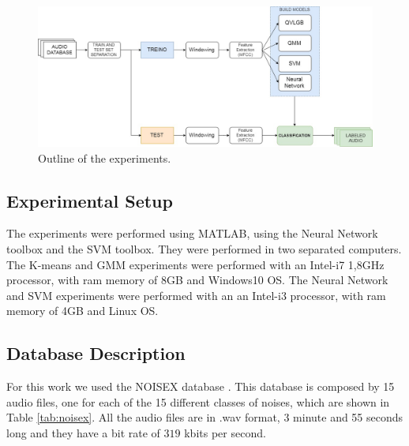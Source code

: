 \documentclass[12pt]{article}
\begin{document}
\begin{figure}[ht]
\centering
\includegraphics[width=\textwidth]{diagrama_artigo.jpg}
\caption{Outline of the experiments.}
\label{fig:exp}
\end{figure}

\subsection{Experimental Setup} \label{exp:setup}


The experiments were performed using MATLAB, using the Neural Network toolbox and the SVM toolbox. They were performed in two separated computers. The K-means and GMM experiments were performed with an Intel-i7 1,8GHz processor, with ram memory of 8GB and Windows10 OS. The Neural Network and SVM experiments were performed with an an Intel-i3 processor, with ram memory of 4GB and Linux OS.

\subsection{Database Description} \label{exp:data}


For this work we used the NOISEX database \cite{varga1993assessment}. This database is composed by 15 audio files, one for each of the 15 different classes of noises, which are shown in Table \ref{tab:noisex}. All the audio files are in .wav format, 3 minute and 55 seconds long and they have a bit rate of $319$ kbits per second.
\end{document}
